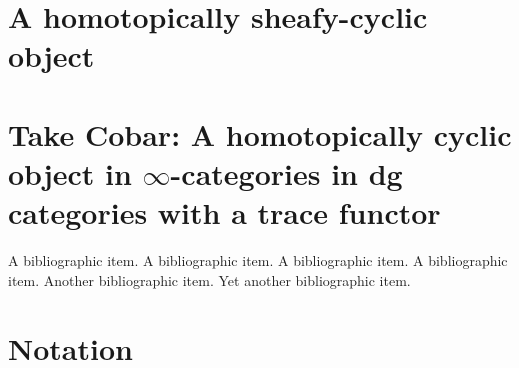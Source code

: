 \documentclass[12pt]{nuthesis}
\theoremstyle{definition}
\theoremstyle{remark}
\theoremstyle{example}
\begin{document}
\chapter{A homotopically sheafy-cyclic object}
	
	

\chapter{Take Cobar: A homotopically cyclic object in $\infty$-categories in dg categories
with a trace functor}



%
\begin{singlespace}
\clearpage{} %
\begin{thebibliography}{xxx}

 A bibliographic item.  A bibliographic item.  A
bibliographic item.  A bibliographic item.
 Another bibliographic item.  
 Yet another bibliographic item.  
\end{thebibliography}
\end{singlespace}

% 



\appendix		%




\chapter{Notation}	%
	
\end{document}
